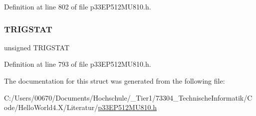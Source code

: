 Definition at line 802 of file p33\+E\+P512\+M\+U810.\+h.

\mbox{\label{structtag_i_c5_c_o_n2_b_i_t_s_ab379549de54ac93ad4aa73686c34cb7c}} 
\subsubsection{\texorpdfstring{T\+R\+I\+G\+S\+T\+AT}{TRIGSTAT}}
{\footnotesize\ttfamily unsigned T\+R\+I\+G\+S\+T\+AT}



Definition at line 793 of file p33\+E\+P512\+M\+U810.\+h.



The documentation for this struct was generated from the following file\+:\begin{DoxyCompactItemize}
\item 
C\+:/\+Users/00670/\+Documents/\+Hochschule/\+\_\+\+Tier1/73304\+\_\+\+Technische\+Informatik/\+Code/\+Hello\+World4.\+X/\+Literatur/\hyperlink{p33_e_p512_m_u810_8h}{p33\+E\+P512\+M\+U810.\+h}\end{DoxyCompactItemize}
